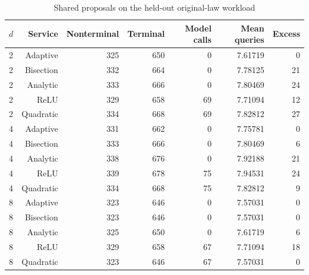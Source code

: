 \begin{table}[htbp]
\centering\caption{Shared proposals on the held-out original-law workload}\label{tab:work89}
{\small\setlength{\tabcolsep}{3pt}\begin{tabular}{lrrrrrr}
\hline
$d$ & Service & Nonterminal & Terminal & Model calls & Mean queries & Excess \\
\hline
2 & Adaptive & 325 & 650 & 0 & 7.61719 & 0 \\
2 & Bisection & 332 & 664 & 0 & 7.78125 & 21 \\
2 & Analytic & 333 & 666 & 0 & 7.80469 & 24 \\
2 & ReLU & 329 & 658 & 69 & 7.71094 & 12 \\
2 & Quadratic & 334 & 668 & 69 & 7.82812 & 27 \\
4 & Adaptive & 331 & 662 & 0 & 7.75781 & 0 \\
4 & Bisection & 333 & 666 & 0 & 7.80469 & 6 \\
4 & Analytic & 338 & 676 & 0 & 7.92188 & 21 \\
4 & ReLU & 339 & 678 & 75 & 7.94531 & 24 \\
4 & Quadratic & 334 & 668 & 75 & 7.82812 & 9 \\
8 & Adaptive & 323 & 646 & 0 & 7.57031 & 0 \\
8 & Bisection & 323 & 646 & 0 & 7.57031 & 0 \\
8 & Analytic & 325 & 650 & 0 & 7.61719 & 6 \\
8 & ReLU & 329 & 658 & 67 & 7.71094 & 18 \\
8 & Quadratic & 323 & 646 & 67 & 7.57031 & 0 \\
\hline
\end{tabular}}
\par{}
\end{table}
